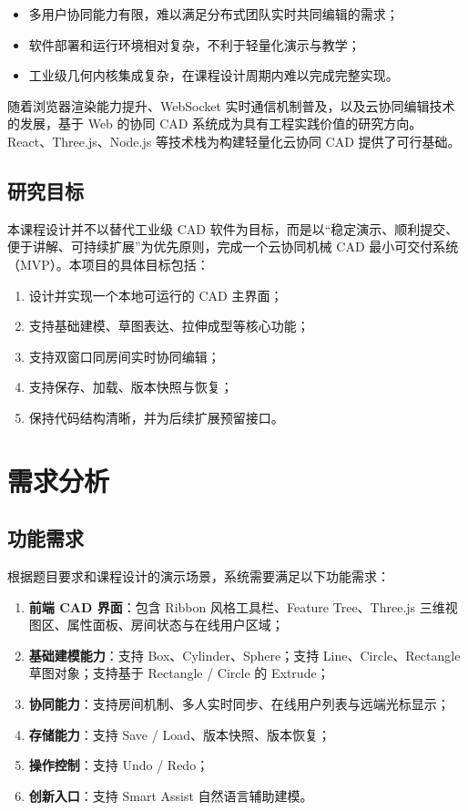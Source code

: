 \documentclass[supercite,macfont]{HustGSClassPaper}
\begin{document}
\begin{itemize}[leftmargin=2em]
  \item 多用户协同能力有限，难以满足分布式团队实时共同编辑的需求；
  \item 软件部署和运行环境相对复杂，不利于轻量化演示与教学；
  \item 工业级几何内核集成复杂，在课程设计周期内难以完成完整实现。
\end{itemize}

随着浏览器渲染能力提升、WebSocket 实时通信机制普及，以及云协同编辑技术的发展，基于 Web 的协同 CAD 系统成为具有工程实践价值的研究方向。React、Three.js、Node.js 等技术栈为构建轻量化云协同 CAD 提供了可行基础\cite{react2025,threejs2025,nodejs2025}。

\subsection{研究目标}

本课程设计并不以替代工业级 CAD 软件为目标，而是以“稳定演示、顺利提交、便于讲解、可持续扩展”为优先原则，完成一个云协同机械 CAD 最小可交付系统（MVP）。本项目的具体目标包括：

\begin{enumerate}[leftmargin=2em]
  \item 设计并实现一个本地可运行的 CAD 主界面；
  \item 支持基础建模、草图表达、拉伸成型等核心功能；
  \item 支持双窗口同房间实时协同编辑；
  \item 支持保存、加载、版本快照与恢复；
  \item 保持代码结构清晰，并为后续扩展预留接口。
\end{enumerate}

\section{需求分析}

\subsection{功能需求}

根据题目要求和课程设计的演示场景，系统需要满足以下功能需求：

\begin{enumerate}[leftmargin=2em]
  \item \textbf{前端 CAD 界面}：包含 Ribbon 风格工具栏、Feature Tree、Three.js 三维视图区、属性面板、房间状态与在线用户区域；
  \item \textbf{基础建模能力}：支持 Box、Cylinder、Sphere；支持 Line、Circle、Rectangle 草图对象；支持基于 Rectangle / Circle 的 Extrude；
  \item \textbf{协同能力}：支持房间机制、多人实时同步、在线用户列表与远端光标显示；
  \item \textbf{存储能力}：支持 Save / Load、版本快照、版本恢复；
  \item \textbf{操作控制}：支持 Undo / Redo；
  \item \textbf{创新入口}：支持 Smart Assist 自然语言辅助建模。
\end{enumerate}
\end{document}
